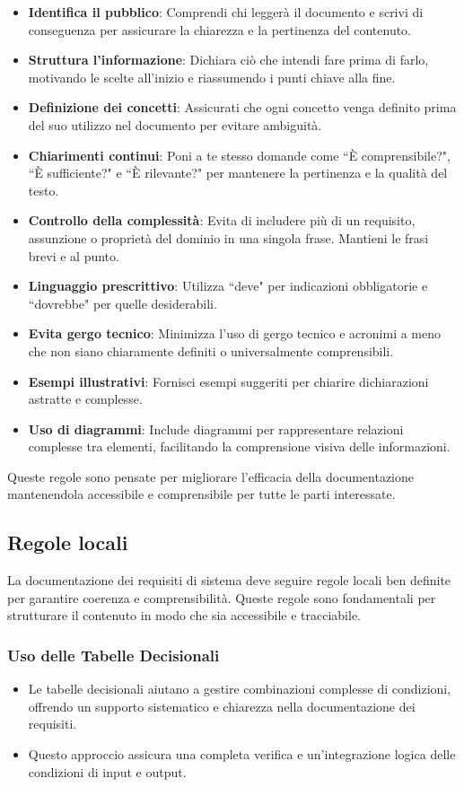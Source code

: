 \begin{itemize}
    \item \textbf{Identifica il pubblico}: Comprendi chi leggerà il documento e scrivi
    di conseguenza per assicurare la chiarezza e la pertinenza del contenuto.
    \item \textbf{Struttura l'informazione}: Dichiara ciò che intendi fare prima di
    farlo, motivando le scelte all'inizio e riassumendo i punti chiave alla fine.
    \item \textbf{Definizione dei concetti}: Assicurati che ogni concetto venga definito
    prima del suo utilizzo nel documento per evitare ambiguità.
    \item \textbf{Chiarimenti continui}: Poni a te stesso domande come ``È comprensibile?",
    ``È sufficiente?" e ``È rilevante?" per mantenere la pertinenza e la qualità del testo.
    \item \textbf{Controllo della complessità}: Evita di includere più di un requisito,
    assunzione o proprietà del dominio in una singola frase. Mantieni le frasi brevi e
    al punto.
    \item \textbf{Linguaggio prescrittivo}: Utilizza ``deve" per indicazioni obbligatorie
    e ``dovrebbe" per quelle desiderabili.
    \item \textbf{Evita gergo tecnico}: Minimizza l'uso di gergo tecnico e acronimi a
    meno che non siano chiaramente definiti o universalmente comprensibili.
    \item \textbf{Esempi illustrativi}: Fornisci esempi suggeriti per chiarire dichiarazioni
    astratte e complesse.
    \item \textbf{Uso di diagrammi}: Include diagrammi per rappresentare relazioni
    complesse tra elementi, facilitando la comprensione visiva delle informazioni.
\end{itemize}

Queste regole sono pensate per migliorare l'efficacia della documentazione mantenendola
accessibile e comprensibile per tutte le parti interessate.

\subsection{Regole locali}
La documentazione dei requisiti di sistema deve seguire regole locali ben definite per garantire coerenza e comprensibilità. Queste regole sono fondamentali per strutturare il contenuto in modo che sia accessibile e tracciabile.
\subsubsection{Uso delle Tabelle Decisionali}
\begin{itemize}
    \item Le tabelle decisionali aiutano a gestire combinazioni complesse di condizioni, offrendo un supporto sistematico e chiarezza nella documentazione dei requisiti.
    \item Questo approccio assicura una completa verifica e un'integrazione logica delle condizioni di input e output.
\end{itemize}

